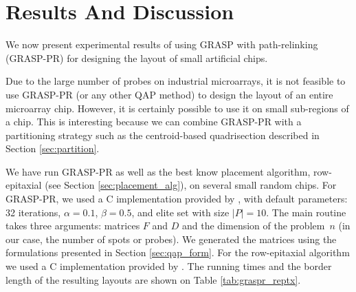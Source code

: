 \documentclass{bioinfo}
\begin{document}
\section{Results And Discussion}
\label{sec:results}

We now present experimental results of using GRASP with path-relinking (GRASP-PR) for designing the layout of small artificial chips.

Due to the large number of probes on industrial microarrays, it is not feasible to use GRASP-PR (or any other QAP method) to design the layout of an entire microarray chip. However, it is certainly possible to use it on small sub-regions of a chip. This is interesting because we can combine GRASP-PR with a partitioning strategy such as the centroid-based quadrisection described in Section \ref{sec:partition}.

We have run GRASP-PR as well as the best know placement algorithm, row-epitaxial (see Section \ref{sec:placement_alg}), on several small random chips. For GRASP-PR, we used a C implementation provided by \citealp{OLIVEIRA04}, with default parameters: 32 iterations, $\alpha=0.1$, $\beta=0.5$, and elite set with size $\mid P\mid = 10$. The main routine takes three arguments: matrices $F$ and $D$ and the dimension of the problem~$n$ (in our case, the number of spots or probes). We generated the matrices using the formulations presented in Section \ref{sec:qap_form}. For the row-epitaxial algorithm we used a C implementation provided by \citealp{KAHNG03A}. The running times and the border length of the resulting layouts are shown on Table \ref{tab:graspr_reptx}.
\end{document}
